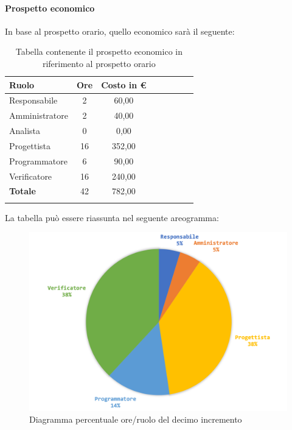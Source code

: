 		\paragraph{Prospetto economico}
		In base al prospetto orario, quello economico sarà il seguente: 
		
		\begin{longtable}{|l|c|c|c|c|c|c|c|}
			\hline
			\rowcolor{lighter-grayer}
			\textbf{Ruolo} & \textbf{Ore} & \textbf{Costo in € } \\
			\hline
			\endfirsthead
			
			\hline
			Responsabile 	    & 2 & 60,00\\
			\hline 
			\hline
			Amministratore	   & 2 & 40,00\\
			\hline
			\hline
			Analista 				& 0 & 0,00\\
			\hline
			\hline
			Progettista 		   & 16 & 352,00\\
			\hline
			\hline
			Programmatore 	  & 6 & 90,00\\
			\hline
			\hline
			Verificatore 		   & 16 & 240,00\\
			\hline
			\textbf{Totale} 	 & 42 & 782,00\\
			\hline
			\caption{Tabella contenente il prospetto economico in riferimento al prospetto orario}
		\end{longtable}
		
		La tabella può essere riassunta nel seguente areogramma:
		\begin{figure}[H]
			\centering
			\includegraphics[width=0.8\linewidth]{./images/preventivo/incremento10-2.png}
			\caption{Diagramma percentuale ore/ruolo del decimo incremento}
			\label{fig:diagramma costi ruolo incremento X}
		\end{figure}
		\pagebreak
		

